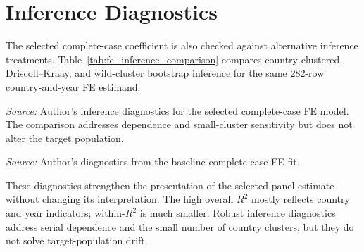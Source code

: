 \FloatBarrier

\section{Inference Diagnostics}

The selected complete-case coefficient is also checked against alternative inference treatments. Table~\ref{tab:fe_inference_comparison} compares country-clustered, Driscoll--Kraay, and wild-cluster bootstrap inference for the same 282-row country-and-year FE estimand.

\begin{table}[htbp]
\centering
\small
\caption{Inference diagnostics for the selected complete-case poverty coefficient. The table compares country-clustered, Driscoll--Kraay, and wild-cluster bootstrap inference for the same 282-row country-and-year FE estimand.}
\label{tab:fe_inference_comparison}

\vspace{0.25em}

\begin{minipage}{0.94\textwidth}
\scriptsize \textit{Source:} Author's inference diagnostics for the selected complete-case FE model. The comparison addresses dependence and small-cluster sensitivity but does not alter the target population.
\end{minipage}
\end{table}

\begin{table}[htbp]
\centering
\small
\caption{Fit diagnostics for the selected complete-case FE model. The table foregrounds within-\(R^2\), country count, year coverage, and years per country so the absorbed country/year structure is not mistaken for explanatory power of the time-varying covariates.}
\label{tab:fe_fit_diagnostics}

\vspace{0.25em}

\begin{minipage}{0.94\textwidth}
\scriptsize \textit{Source:} Author's diagnostics from the baseline complete-case FE fit.
\end{minipage}
\end{table}

These diagnostics strengthen the presentation of the selected-panel estimate without changing its interpretation. The high overall \(R^2\) mostly reflects country and year indicators; within-\(R^2\) is much smaller. Robust inference diagnostics address serial dependence and the small number of country clusters, but they do not solve target-population drift.

